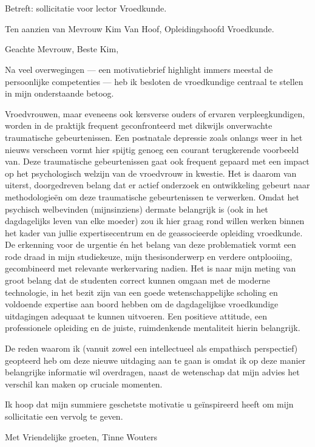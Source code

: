 \documentclass[]{article}
\title{}
\author{}
\begin{document}
\maketitle

\begin{abstract}

\end{abstract}

\section{}

Betreft: sollicitatie voor lector Vroedkunde.

Ten aanzien van Mevrouw Kim Van Hoof, Opleidingshoofd Vroedkunde.

Geachte Mevrouw,
Beste Kim,

Na veel overwegingen — een motivatiebrief highlight immers meestal de persoonlijke competenties — heb ik besloten de vroedkundige centraal te stellen in mijn onderstaande betoog.

Vroedvrouwen, maar eveneens ook kersverse ouders of ervaren verpleegkundigen, worden in de praktijk frequent geconfronteerd met dikwijls onverwachte traumatische gebeurtenissen. Een postnatale depressie zoals onlangs weer in het nieuws verscheen vormt hier spijtig genoeg een courant terugkerende voorbeeld van.
Deze traumatische gebeurtenissen gaat ook frequent gepaard met een impact op het psychologisch welzijn van de vroedvrouw in kwestie. Het is daarom van uiterst, doorgedreven belang dat er actief onderzoek en ontwikkeling gebeurt naar methodologieën om deze traumatische gebeurtenissen te verwerken.
Omdat het psychisch welbevinden (mijnsinziens) dermate belangrijk is (ook in het dagdagelijks leven van elke moeder) zou ik hier graag rond willen werken binnen het kader van jullie expertisecentrum en de geassocieerde opleiding vroedkunde. De erkenning voor de urgentie én het belang van deze problematiek vormt een rode draad in mijn studiekeuze, mijn thesisonderwerp en verdere ontplooiing, gecombineerd met relevante werkervaring nadien.
Het is naar mijn meting van groot belang dat de studenten correct kunnen omgaan met de moderne technologie, in het bezit zijn van een goede wetenschappelijke scholing en voldoende expertise aan boord hebben om de dagdagelijkse vroedkundige uitdagingen adequaat te kunnen uitvoeren.
Een positieve attitude, een professionele opleiding en de juiste, ruimdenkende mentaliteit hierin belangrijk.

De reden waarom ik (vanuit zowel een intellectueel als empathisch perspectief) geopteerd heb om deze nieuwe uitdaging aan te gaan is omdat ik op deze manier belangrijke informatie wil overdragen, naast de wetenschap dat mijn advies het verschil kan maken op cruciale momenten.

Ik hoop dat mijn summiere geschetste motivatie u geïnspireerd heeft om mijn sollicitatie een vervolg te geven.

Met Vriendelijke groeten,
Tinne Wouters
\end{document}

